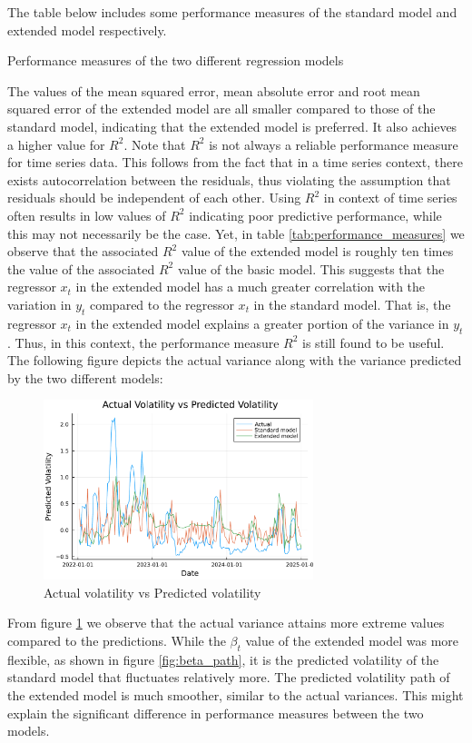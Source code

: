 The table below includes some performance measures of the standard model and extended model respectively.
\begin{table}[H]
    \centering

\caption{Performance measures of the two different regression models} 
\label{tab:performance_measures}
\end{table}
The values of the mean squared error, mean absolute error and root mean squared error of the extended model are all smaller compared to those of the standard model, indicating that the extended model is preferred. It also achieves a higher value for \(R^2\). Note that \(R^2\) is not always a reliable performance measure for time series data. This follows from the fact that in a time series context, there exists autocorrelation between the residuals, thus violating the assumption that residuals should be independent of each other. Using \(R^2\) in context of time series often results in low values of \(R^2\) indicating poor predictive performance, while this may not necessarily be the case. Yet, in table \ref{tab:performance_measures} we observe that the associated \(R^2\) value of the extended model is roughly ten times the value of the associated \(R^2\) value of the basic model. This suggests that the regressor \(x_t\) in the extended model has a much greater correlation with the variation in \(y_t\) compared to the regressor \(x_t\) in the standard model. That is, the regressor \(x_t\) in the extended model explains a greater portion of the variance in \(y_t\). Thus, in this context, the performance measure \(R^2\) is still found to be useful.
The following figure depicts the actual variance along with the variance predicted by the two different models:

\begin{figure}[H]
    \centering
    \includegraphics[width=0.7\textwidth]{figures/predicting_volatility.pdf}
    \caption{Actual volatility vs Predicted volatility}
    \label{fig:predicting_volatility}
\end{figure}
From figure \ref{fig:predicting_volatility} we observe that the actual variance attains more extreme values compared to the predictions. While the \(\beta_t\) value of the extended model was more flexible, as shown in figure \ref{fig:beta_path}, it is the predicted volatility of the standard model that fluctuates relatively more. The predicted volatility path of the extended model is much smoother, similar to the actual variances. This might explain the significant difference in performance measures between the two models. 

